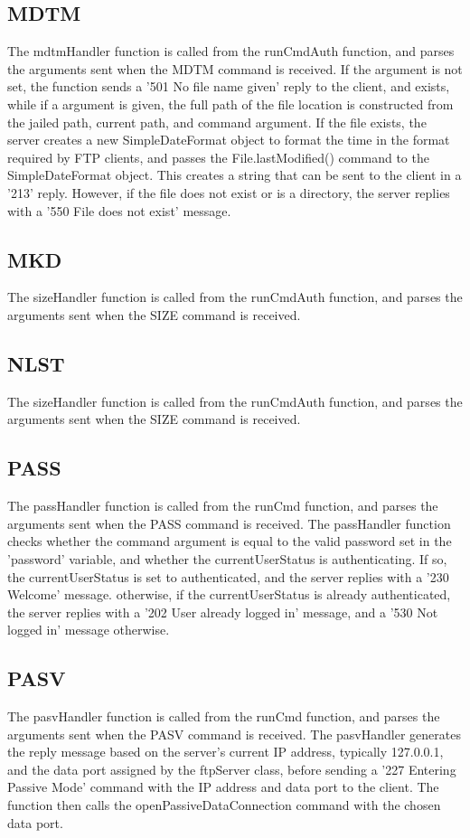 \documentclass[11pt,a4paper,titlepage]{article}
\begin{document}
\subsection{MDTM}
The mdtmHandler function is called from the runCmdAuth function, and parses the arguments sent when the MDTM command is received. If the argument is not set, the function sends a '501 No file name given' reply to the client, and exists, while if a argument is given, the full path of the file location is constructed from the jailed path, current path, and command argument. If the file exists, the server creates a new SimpleDateFormat object to format the time in the format required by FTP clients, and passes the File.lastModified() command to the SimpleDateFormat object. This creates a string that can be sent to the client in a '213' reply. However, if the file does not exist or is a directory, the server replies with a '550 File does not exist' message.

\subsection{MKD}
The sizeHandler function is called from the runCmdAuth function, and parses the arguments sent when the SIZE command is received.

\subsection{NLST}
The sizeHandler function is called from the runCmdAuth function, and parses the arguments sent when the SIZE command is received.

\subsection{PASS}
The passHandler function is called from the runCmd function, and parses the arguments sent when the PASS command is received. The passHandler function checks whether the command argument is equal to the valid password set in the 'password' variable, and whether the currentUserStatus is authenticating. If so, the currentUserStatus is set to authenticated, and the server replies with a '230 Welcome' message. otherwise, if the currentUserStatus is already authenticated, the server replies with a '202 User already logged in' message, and a '530 Not logged in' message otherwise.

\subsection{PASV}
The pasvHandler function is called from the runCmd function, and parses the arguments sent when the PASV command is received. The pasvHandler generates the reply message based on the server's current IP address, typically 127.0.0.1, and the data port assigned by the ftpServer class, before sending a '227 Entering Passive Mode' command with the IP address and data port to the client. The function then calls the openPassiveDataConnection command with the chosen data port.
\end{document}
